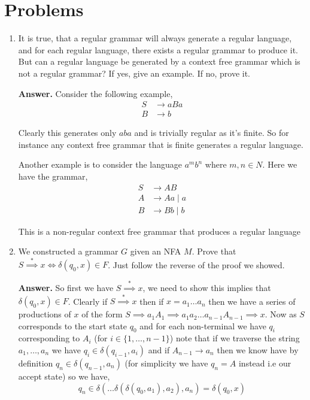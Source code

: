 \documentclass[11pt]{article}
\begin{document}
\section{Problems}
\begin{enumerate}
    \item It is true, that a regular grammar will always generate a regular language, and for each regular language, there exists a regular grammar to produce it.  But can a regular language be generated by a context free grammar which is not a regular grammar? If yes, give an example. If no, prove it. 

      \textbf{Answer.} Consider the following example, 
      \begin{align*}
        S &\to aBa \\
        B &\to b
      \end{align*}

      Clearly this generates only $aba$ and is trivially regular as it's finite. So for instance any context free grammar that is finite generates a regular language.

      \vspace{1em}
      
      Another example is to consider the language $a^{m}b^{n}$ where $m, n \in N$. Here we have the grammar, 
      \begin{align*}
        S &\to AB\\
        A &\to Aa \mid a \\
        B &\to Bb \mid b
      \end{align*}

      This is a non-regular context free grammar that produces a regular language



    \item We constructed a grammar $G$ given an NFA $M$. Prove that $S \stackrel{*}{\implies} x \iff \delta(q_0,x) \in F$. Just follow the reverse of the proof we showed.


      \textbf{Answer. } So first we have $S \stackrel{*}{\implies} x$, we need to show this implies that $\delta(q_{0}, x) \in F$. Clearly if $S \stackrel{*}{\implies} x$ then if $x = a_{1} \dots a_n$ then we have a series of productions of $x$ of the form $S \implies a_{1}A_{1} \implies a_{1}a_{2} \dots a_{n - 1}A_{n - 1} \implies x$. Now as $S$ corresponds to the start state $q_{0}$ and for each non-terminal we have $q_{i}$ corresponding to $A_i$ (for $i \in \{1, \dots, n - 1\}$) note that if we traverse the string $a_{1}, \dots, a_{n}$ we have $q_i \in \delta(q_{i - 1}, a_i)$ and if $A_{n - 1} \to a_n$ then we know have by definition $q_n \in \delta(q_{n -1}, a_n)$ (for simplicity we have $q_n = A$ instead i.e our accept state) so we have, 
      \[
        q_n \in  \delta(\dots \delta(\delta(q_{0}, a_{1}), a_{2}), a_n) = \delta(q_{0}, x)
      \]


\end{enumerate}
\end{document}

